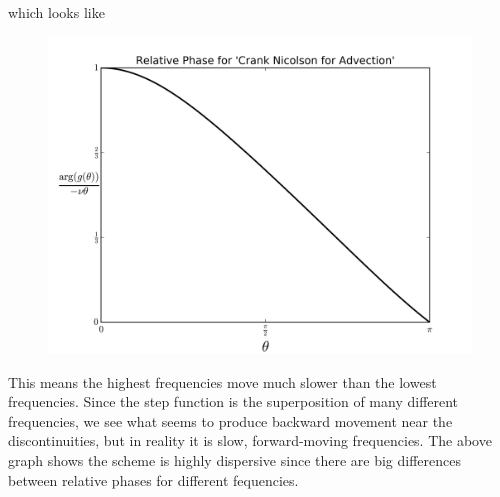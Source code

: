 \documentclass{article} %
\theoremstyle{plain}
\numberwithin{equation}{section} %
\numberwithin{figure}{section} %
\numberwithin{table}{section} %
\begin{document}
\begin{enumerate}[\ \ (a)]
\begin{align*}
        \end{align*}
        which looks like
        \begin{figure}[ht!]
            \centering
            \includegraphics[width=\textwidth]{figures/relative_phase.png}
        \end{figure}
        \FloatBarrier
        This means the highest frequencies move much slower than the lowest frequencies.  Since the step function is the superposition of many different frequencies, we see what seems to produce backward movement near the discontinuities, but in reality it is slow, forward-moving frequencies.  The above graph shows the scheme is highly dispersive since there are big differences between relative phases for different fequencies.

\end{enumerate}
\end{document}
